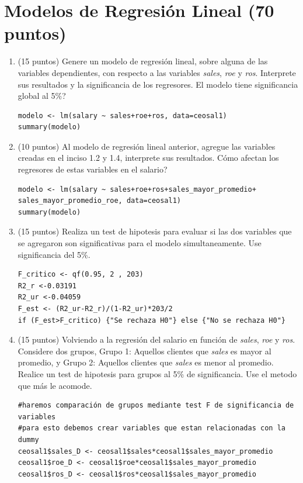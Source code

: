 \documentclass[letterpaper,11pt]{article}
\begin{document}
\section{Modelos de Regresión Lineal (70 puntos)}

\begin{enumerate}

    \item (15 puntos) Genere un modelo de regresión lineal, sobre alguna de las variables dependientes, con respecto a las variables \textit{sales}, \textit{roe} y \textit{ros}. Interprete sus resultados y la significancia de los regresores. \textquestiondown El modelo tiene significancia global al 5\%?
\begin{lstlisting}
modelo <- lm(salary ~ sales+roe+ros, data=ceosal1)
summary(modelo)
\end{lstlisting}
\item (10 puntos) Al modelo de regresión lineal anterior, agregue las variables creadas en el inciso 1.2 y 1.4, interprete sus resultados. \textquestiondown Cómo afectan los regresores de estas variables en el salario?
\begin{lstlisting}
modelo <- lm(salary ~ sales+roe+ros+sales_mayor_promedio+ sales_mayor_promedio_roe, data=ceosal1)
summary(modelo)
\end{lstlisting}


\item (15 puntos) Realiza un test de hipotesis para evaluar si las dos variables que se agregaron son significativas para el modelo simultaneamente. Use significancia del 5\%.

\begin{lstlisting}
F_critico <- qf(0.95, 2 , 203)
R2_r <-0.03191
R2_ur <-0.04059
F_est <- (R2_ur-R2_r)/(1-R2_ur)*203/2
if (F_est>F_critico) {"Se rechaza H0"} else {"No se rechaza H0"}
\end{lstlisting}

\item (15 puntos) Volviendo a la regresión del salario en función de \textit{sales}, \textit{roe} y \textit{ros}. Considere dos grupos, Grupo 1: Aquellos clientes que \textit{sales} es mayor al promedio, y Grupo 2: Aquellos clientes que \textit{sales} es menor al promedio. Realice un test de hipotesis para grupos al 5\% de significancia. Use el metodo que más le acomode. 

\begin{lstlisting}
#haremos comparación de grupos mediante test F de significancia de variables
#para esto debemos crear variables que estan relacionadas con la dummy
ceosal1$sales_D <- ceosal1$sales*ceosal1$sales_mayor_promedio
ceosal1$roe_D <- ceosal1$roe*ceosal1$sales_mayor_promedio
ceosal1$ros_D <- ceosal1$ros*ceosal1$sales_mayor_promedio


\end{lstlisting}
\end{enumerate}
\end{document}
